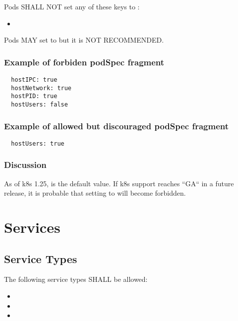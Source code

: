 \documentclass[PMO,authoryear,toc]{lsstdoc}
\begin{document}
Pods SHALL NOT set any of these  keys to :

\begin{itemize}
  \item {}
\end{itemize}

Pods MAY set  to  but it is NOT RECOMMENDED.

\subsubsection{Example of forbiden podSpec fragment}

\begin{verbatim}
  hostIPC: true
  hostNetwork: true
  hostPID: true
  hostUsers: false
\end{verbatim}

\subsubsection{Example of allowed but discouraged podSpec fragment}

\begin{verbatim}
  hostUsers: true
\end{verbatim}

\subsubsection{Discussion}

As of k8s 1.25,  is the default value.
If k8s  support reaches ``GA`` in a future release, it is probable that setting  to  will become forbidden.

\section{Services}\label{sec:svc}

\subsection{Service Types}

The following service types SHALL be allowed:

\begin{itemize}
  \item {}
  \item {}
  \item {}
\end{itemize}
\end{document}
